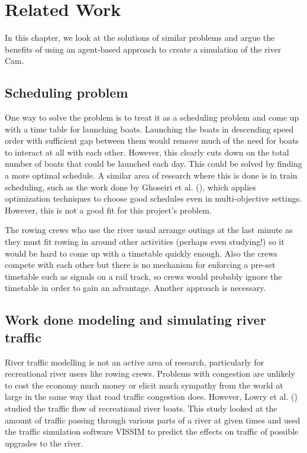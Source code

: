 \chapter{Related Work}\label{chapter:background}
  In this chapter, we look at the solutions of similar problems and argue the benefits of using an agent-based approach to create a simulation of the river Cam.

  \section{Scheduling problem}
    One way to solve the problem is to treat it as a scheduling problem and come up with a time table for launching boats. Launching the boats in descending speed order with sufficient gap between them would remove much of the need for boats to interact at all with each other. However, this clearly cuts down on the total number of boats that could be launched each day. This could be solved by finding a more optimal schedule. A similar area of research where this is done is in train scheduling, such as the work done by Ghoseiri et al. (\cite{Ghoseiri2004}), which applies optimization techniques to choose good schedules even in multi-objective settings. However, this is not a good fit for this project's problem. 
    
    The rowing crews who use the river usual arrange outings at the last minute as they must fit rowing in around other activities (perhaps even studying!) so it would be hard to come up with a timetable quickly enough. Also the crews compete with each other but there is no mechanism for enforcing a pre-set timetable such as signals on a rail track, so crews would probably ignore the timetable in order to gain an advantage. Another approach is necessary.

  \section{Work done modeling and simulating river traffic}
  River traffic modelling is not an active area of research, particularly for recreational river users like rowing crews. Problems with congestion are unlikely to cost the economy much money or elicit much sympathy from the world at large in the same way that road traffic congestion does. However, Lowry et al. (\cite{Lowry2011})  studied the traffic flow of recreational river boats. This study looked at the amount of traffic passing through various parts of a river at given times and used the traffic simulation software VISSIM to predict the effects on traffic of possible upgrades to the river. 
  
